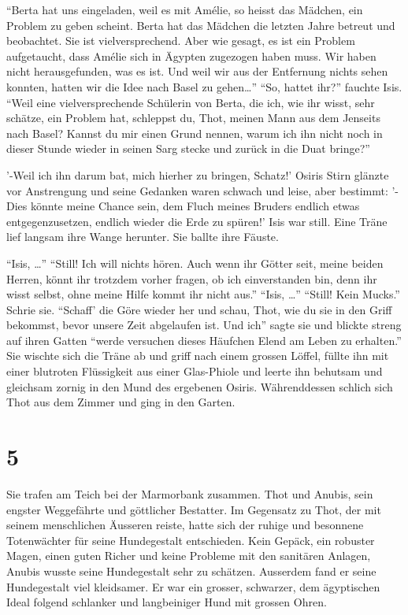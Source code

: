 \documentclass[11pt,titlepage,a5paper]{book}
\begin{document}
"`Berta hat uns eingeladen, weil es mit Amélie, so heisst das Mädchen, ein Problem zu geben scheint. Berta hat das Mädchen die letzten Jahre betreut und beobachtet. Sie ist vielversprechend. Aber wie gesagt, es ist ein Problem aufgetaucht, dass Amélie sich in Ägypten zugezogen haben muss. Wir haben nicht herausgefunden, was es ist. Und weil wir aus der Entfernung nichts sehen konnten, hatten wir die Idee nach Basel zu gehen\dots"' "`So, hattet ihr?"' fauchte Isis. "`Weil eine vielversprechende Schülerin von Berta, die ich, wie ihr wisst, sehr schätze, ein Problem hat, schleppst du, Thot, meinen Mann aus dem Jenseits nach Basel? Kannst du mir einen Grund nennen, warum ich ihn nicht noch in dieser Stunde wieder in seinen Sarg stecke und zurück in die Duat bringe?"'

 '-Weil ich ihn darum bat, mich hierher zu bringen, Schatz!' Osiris Stirn glänzte vor Anstrengung und seine Gedanken waren schwach und leise, aber bestimmt: '-Dies könnte meine Chance sein, dem Fluch meines Bruders endlich etwas entgegenzusetzen, endlich wieder die Erde zu spüren!' Isis war still. Eine Träne lief langsam ihre Wange herunter. Sie ballte ihre Fäuste.
 
 "`Isis, \dots"' "`Still! Ich will nichts hören. Auch wenn ihr Götter seit, meine beiden Herren, könnt ihr trotzdem vorher fragen, ob ich einverstanden bin, denn ihr wisst selbst, ohne meine Hilfe kommt ihr nicht aus."' "`Isis, \dots"' "`Still! Kein Mucks."' Schrie sie. "`Schaff' die Göre wieder her und schau, Thot, wie du sie in den Griff bekommst, bevor unsere Zeit abgelaufen ist. Und ich"' sagte sie und blickte streng auf ihren Gatten "`werde versuchen dieses Häufchen Elend am Leben zu erhalten."' Sie wischte sich die Träne ab und griff nach einem grossen Löffel, füllte ihn mit einer blutroten Flüssigkeit aus einer Glas-Phiole und leerte ihn behutsam und gleichsam zornig in den Mund des ergebenen Osiris. Währenddessen schlich sich Thot aus dem Zimmer und ging in den Garten.



\section*{5}

Sie trafen am Teich bei der Marmorbank zusammen. Thot und Anubis, sein engster Weggefährte und göttlicher Bestatter. Im Gegensatz zu Thot, der mit seinem menschlichen Äusseren reiste, hatte sich der ruhige und besonnene Totenwächter für seine Hundegestalt entschieden. Kein Gepäck, ein robuster Magen, einen guten Richer und keine Probleme mit den sanitären Anlagen, Anubis wusste seine Hundegestalt sehr zu schätzen. Ausserdem fand er seine Hundegestalt viel kleidsamer. Er war ein grosser, schwarzer, dem ägyptischen Ideal folgend schlanker und langbeiniger Hund mit grossen Ohren.
\end{document}
